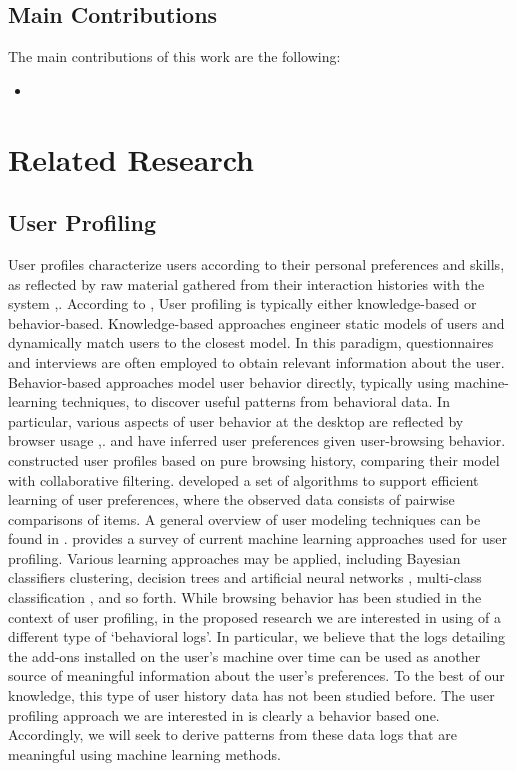 \documentclass[11pt,oneside]{book}
\let\Oldsection\section
\renewcommand{\section}{\FloatBarrier\Oldsection}
\begin{document}
\section{Main Contributions}
\label{sub:contributions}
The main contributions of this work are the following:
\begin{itemize}
\renewcommand{\labelitemi}{$\bullet$} 
\item 
\end{itemize}

\chapter{Related Research}
\label{sec:related}


\section{User Profiling}

User profiles characterize users according to their personal
preferences and skills, as reflected by raw material gathered from
their interaction histories with the system \citep{koch2001software},\citep{gauch2007user}. According to \citep{gauch2007user}, User profiling is typically either knowledge-based or
behavior-based. Knowledge-based approaches engineer static models of
users and dynamically match users to the closest model. In this
paradigm, questionnaires and interviews are often employed to obtain
relevant information about the user. Behavior-based approaches model
user behavior directly, typically using machine-learning techniques,
to discover useful patterns from behavioral data. In particular,
various aspects of user behavior at the desktop are reflected by
browser usage \citep{benevenuto2009characterizing},\citep{bilenko11}. \citep{lieberman1995letizia} and \citep{joachims97} have inferred user preferences given user-browsing behavior. \citep{sugiyama2004adaptive} constructed user profiles based on pure browsing history,
comparing their model with collaborative filtering.  \citep{lu2011learning} developed a set of algorithms to support efficient
learning of user preferences, where the observed data consists of
pairwise comparisons of items.  A general overview of user modeling
techniques can be found in \citep{leontiadis2012don}. \citep{sebastiani02} provides a survey of current machine learning
approaches used for user profiling.  Various learning approaches may
be applied, including Bayesian classifiers clustering, decision trees
and artificial neural networks \citep{pazzani97}, multi-class classification \cite{bauer2014analyzing},
and so forth.  While browsing behavior has been studied in the context
of user profiling, in the proposed research we are interested in using
of a different type of `behavioral logs'. In particular, we believe
that the logs detailing the add-ons installed on the user's machine
over time can be used as another source of meaningful information
about the user's preferences. To the best of our knowledge, this type
of user history data has not been studied before. The user profiling
approach we are interested in is clearly a behavior based
one. Accordingly, we will seek to derive patterns from these data logs
that are meaningful using machine learning methods.
\end{document}
